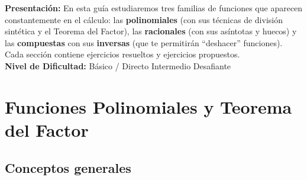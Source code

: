 \documentclass[12pt, a4paper]{article}
\begin{document}


\vspace{4pt}
\begin{cuadroinfo}
  \small
  \textbf{Presentación:} En esta guía estudiaremos tres familias de funciones que aparecen constantemente en el cálculo: las \textbf{polinomiales} (con sus técnicas de división sintética y el Teorema del Factor), las \textbf{racionales} (con sus asíntotas y huecos) y las \textbf{compuestas} con sus \textbf{inversas} (que te permitirán ``deshacer'' funciones). Cada sección contiene ejercicios resueltos y ejercicios propuestos.
  \\[4pt]
  \textbf{Nivel de Dificultad:}\quad
  \facil{} Básico / Directo \quad
  \medio{} Intermedio \quad
  \dificil{} Desafiante
\end{cuadroinfo}

\vspace{8pt}

\section{Funciones Polinomiales y Teorema del Factor}

\subsection{Conceptos generales}
\end{document}
